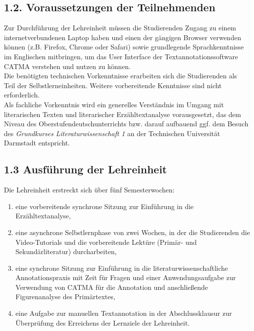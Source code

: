 \documentclass[
          a4paper,
        ]{article}
\providecommand{\tightlist}{%
  \setlength{\itemsep}{0pt}\setlength{\parskip}{0pt}}
\begin{document}
\subsection{1.2. Voraussetzungen der
Teilnehmenden}\label{voraussetzungen-der-teilnehmenden}

Zur Durchführung der Lehreinheit müssen die Studierenden Zugang zu einem
internetverbundenen Laptop haben und einen der gängigen Browser
verwenden können (z.B. Firefox, Chrome oder Safari) sowie grundlegende
Sprachkenntnisse im Englischen mitbringen, um das User Interface der
Textannotationssoftware CATMA verstehen und nutzen zu können.\\
Die benötigten technischen Vorkenntnisse erarbeiten sich die
Studierenden als Teil der Selbstlerneinheiten. Weitere vorbereitende
Kenntnisse sind nicht erforderlich.\\
Als fachliche Vorkenntnis wird ein generelles Verständnis im Umgang mit
literarischen Texten und literarischer Erzähltextanalyse vorausgesetzt,
das dem Niveau des Oberstufendeutschunterrichts bzw. darauf aufbauend
ggf. dem Besuch des \emph{Grundkurses Literaturwissenschaft 1} an der
Technischen Universität Darmstadt entspricht.

\subsection{1.3 Ausführung der
Lehreinheit}\label{ausfuxfchrung-der-lehreinheit}

Die Lehreinheit erstreckt sich über fünf Semesterwochen:

\begin{enumerate}
\def\labelenumi{\arabic{enumi}.}
\tightlist
\item
  eine vorbereitende synchrone Sitzung zur Einführung in die
  Erzähltextanalyse,
\item
  eine asynchrone Selbstlernphase von zwei Wochen, in der die
  Studierenden die Video-Tutorials und die vorbereitende Lektüre
  (Primär- und Sekundärliteratur) durcharbeiten,
\item
  eine synchrone Sitzung zur Einführung in die
  literaturwissenschaftliche Annotationspraxis mit Zeit für Fragen und
  einer Anwendungsaufgabe zur Verwendung von CATMA für die Annotation
  und anschließende Figurenanalyse des Primärtextes,
\item
  eine Aufgabe zur manuellen Textannotation in der Abschlussklausur zur
  Überprüfung des Erreichens der Lernziele der Lehreinheit.
\end{enumerate}
\end{document}
